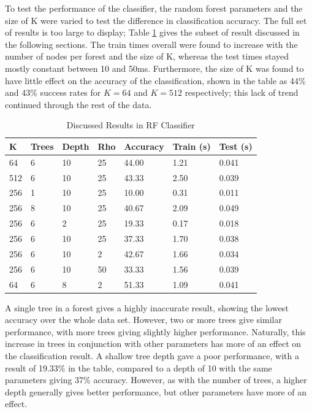 \documentclass[a4paper, 10pt, conference]{ieeeconf}
\begin{document}
To test the performance of the classifier, the random forest parameters and the size of K were varied to test the difference in classification accuracy. The full set of results is too large to display; Table \ref{tbl:rf_discussed} gives the subset of result discussed in the following sections. The train times overall were found to increase with the number of nodes per forest and the size of K, whereas the test times stayed mostly constant between 10 and 50ms. Furthermore, the size of K was found to have little effect on the accuracy of the classification, shown in the table as 44\% and 43\% success rates for $K=64$ and $K=512$ respectively; this lack of trend continued through the rest of the data.

\begin{table}[!ht]
  \centering
  \caption{Discussed Results in RF Classifier}
  \label{tbl:rf_discussed}
  \begin{tabular}{|lllllll|}
  	\hline
    K & Trees & Depth & Rho & Accuracy & Train (s) & Test (s) \\ \hline
    64  & 6 & 10 & 25 & 44.00 & 1.21 & 0.041 \\
    512 & 6 & 10 & 25 & 43.33 & 2.50 & 0.039 \\
    256 & 1 & 10 & 25 & 10.00 & 0.31 & 0.011 \\
    256 & 8 & 10 & 25 & 40.67 & 2.09 & 0.049 \\
    256 & 6 & 2  & 25 & 19.33 & 0.17 & 0.018 \\
    256 & 6 & 10 & 25 & 37.33 & 1.70 & 0.038 \\
    256 & 6 & 10 & 2  & 42.67 & 1.66 & 0.034 \\
    256 & 6 & 10 & 50 & 33.33 & 1.56 & 0.039 \\
    64  & 6 & 8  & 2  & 51.33 & 1.09 & 0.041 \\
  \hline
\end{tabular}

\end{table}

A single tree in a forest gives a highly inaccurate result, showing the lowest accuracy over the whole data set. However, two or more trees give similar performance, with more trees giving slightly higher performance. Naturally, this increase in trees in conjunction with other parameters has more of an effect on the classification result. A shallow tree depth gave a poor performance, with a result of 19.33\% in the table, compared to a depth of 10 with the same parameters giving 37\% accuracy. However, as with the number of trees, a higher depth generally gives better performance, but other parameters have more of an effect.
\end{document}
